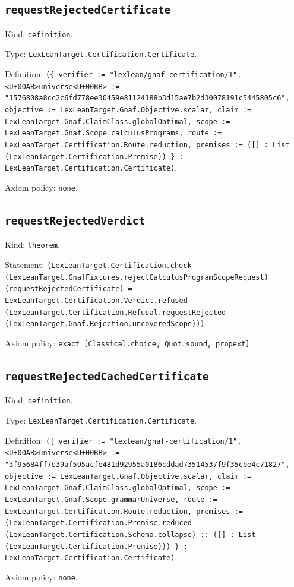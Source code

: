 \documentclass[11pt]{article}
\begin{document}
\subsection*{\texttt{requestRejectedCertificate}}
\noindent Kind: \texttt{definition}.\par
\noindent Type: \texttt{LexLeanTarget.Certification.Certificate}.\par
\noindent Definition: \texttt{(\{ verifier := "lexlean/gnaf-certification/1", <U+00AB>universe<U+00BB> := "1576808a8cc2c6fd778ee30459e81124188b3d15ae7b2d30078191c5445805c6", objective := LexLeanTarget.Gnaf.Objective.scalar, claim := LexLeanTarget.Gnaf.ClaimClass.globalOptimal, scope := LexLeanTarget.Gnaf.Scope.calculusPrograms, route := LexLeanTarget.Certification.Route.reduction, premises := ([] : List (LexLeanTarget.Certification.Premise)) \} : LexLeanTarget.Certification.Certificate)}.\par
\noindent Axiom policy: \texttt{none}.\par
\subsection*{\texttt{requestRejectedVerdict}}
\noindent Kind: \texttt{theorem}.\par
\noindent Statement: \texttt{(LexLeanTarget.Certification.check (LexLeanTarget.GnafFixtures.rejectCalculusProgramScopeRequest) (requestRejectedCertificate) = LexLeanTarget.Certification.Verdict.refused (LexLeanTarget.Certification.Refusal.requestRejected (LexLeanTarget.Gnaf.Rejection.uncoveredScope)))}.\par
\noindent Axiom policy: \texttt{exact [Classical.choice, Quot.sound, propext]}.\par
\subsection*{\texttt{requestRejectedCachedCertificate}}
\noindent Kind: \texttt{definition}.\par
\noindent Type: \texttt{LexLeanTarget.Certification.Certificate}.\par
\noindent Definition: \texttt{(\{ verifier := "lexlean/gnaf-certification/1", <U+00AB>universe<U+00BB> := "3f95684ff7e39af595acfe481d92955a0186cddad73514537f9f35cbe4c71827", objective := LexLeanTarget.Gnaf.Objective.scalar, claim := LexLeanTarget.Gnaf.ClaimClass.globalOptimal, scope := LexLeanTarget.Gnaf.Scope.grammarUniverse, route := LexLeanTarget.Certification.Route.reduction, premises := (LexLeanTarget.Certification.Premise.reduced (LexLeanTarget.Certification.Schema.collapse) :: ([] : List (LexLeanTarget.Certification.Premise))) \} : LexLeanTarget.Certification.Certificate)}.\par
\noindent Axiom policy: \texttt{none}.\par
\end{document}
